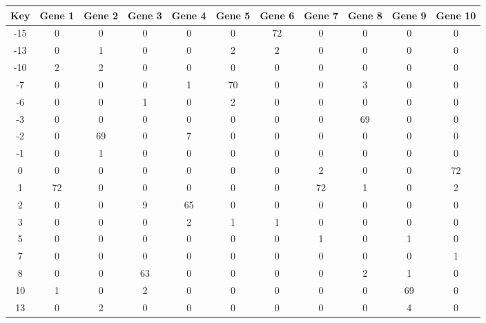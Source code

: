 \begin{tabular}{|c|c|c|c|c|c|c|c|c|c|c|}
\hline
Key & Gene 1 & Gene 2 & Gene 3 & Gene 4 & Gene 5 & Gene 6 & Gene 7 & Gene 8 & Gene 9 & Gene 10 \\
\hline
-15 & 0 & 0 & 0 & 0 & 0 & 72 & 0 & 0 & 0 & 0 \\
-13 & 0 & 1 & 0 & 0 & 2 & 2 & 0 & 0 & 0 & 0 \\
-10 & 2 & 2 & 0 & 0 & 0 & 0 & 0 & 0 & 0 & 0 \\
-7 & 0 & 0 & 0 & 1 & 70 & 0 & 0 & 3 & 0 & 0 \\
-6 & 0 & 0 & 1 & 0 & 2 & 0 & 0 & 0 & 0 & 0 \\
-3 & 0 & 0 & 0 & 0 & 0 & 0 & 0 & 69 & 0 & 0 \\
-2 & 0 & 69 & 0 & 7 & 0 & 0 & 0 & 0 & 0 & 0 \\
-1 & 0 & 1 & 0 & 0 & 0 & 0 & 0 & 0 & 0 & 0 \\
0 & 0 & 0 & 0 & 0 & 0 & 0 & 2 & 0 & 0 & 72 \\
1 & 72 & 0 & 0 & 0 & 0 & 0 & 72 & 1 & 0 & 2 \\
2 & 0 & 0 & 9 & 65 & 0 & 0 & 0 & 0 & 0 & 0 \\
3 & 0 & 0 & 0 & 2 & 1 & 1 & 0 & 0 & 0 & 0 \\
5 & 0 & 0 & 0 & 0 & 0 & 0 & 1 & 0 & 1 & 0 \\
7 & 0 & 0 & 0 & 0 & 0 & 0 & 0 & 0 & 0 & 1 \\
8 & 0 & 0 & 63 & 0 & 0 & 0 & 0 & 2 & 1 & 0 \\
10 & 1 & 0 & 2 & 0 & 0 & 0 & 0 & 0 & 69 & 0 \\
13 & 0 & 2 & 0 & 0 & 0 & 0 & 0 & 0 & 4 & 0 \\
\hline
\end{tabular}